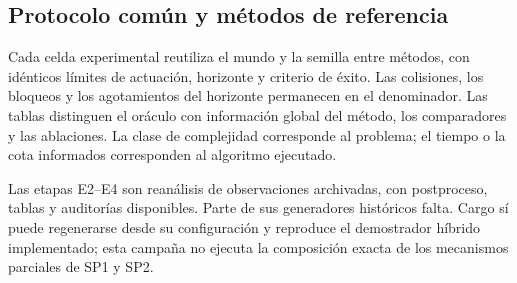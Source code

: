 \subsection{Protocolo común y métodos de referencia}
\label{subsec:common-protocol}

Cada celda experimental reutiliza el mundo y la semilla entre métodos, con idénticos límites de actuación, horizonte y criterio de éxito. Las colisiones, los bloqueos y los agotamientos del horizonte permanecen en el denominador. Las tablas distinguen el oráculo con información global del método, los comparadores y las ablaciones. La clase de complejidad corresponde al problema; el tiempo o la cota informados corresponden al algoritmo ejecutado.

Las etapas E2--E4 son reanálisis de observaciones archivadas, con postproceso, tablas y auditorías disponibles. Parte de sus generadores históricos falta. Cargo sí puede regenerarse desde su configuración y reproduce el demostrador híbrido implementado; esta campaña no ejecuta la composición exacta de los mecanismos parciales de SP1 y SP2.


